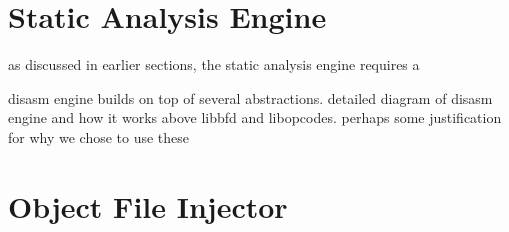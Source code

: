 \section{Static Analysis Engine}

as discussed in earlier sections, the static analysis engine requires a 

disasm engine builds on top of several abstractions. detailed diagram of disasm engine and how it works above libbfd and libopcodes. perhaps some justification for why we chose to use these
%
%
%
%
%
%
%
%
%
%

\section{Object File Injector}


%
%
%
%



